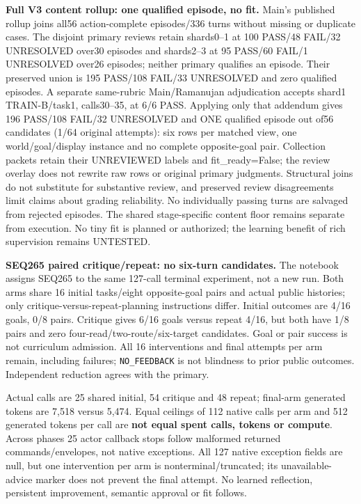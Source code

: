 \documentclass{article}
\begin{document}
\textbf{Full V3 content rollup: one qualified episode, no fit.}
Main's published rollup joins all56 action-complete episodes/336 turns without
missing or duplicate cases. The disjoint primary reviews retain shards0--1 at
100 PASS/48 FAIL/32 UNRESOLVED over30 episodes and shards2--3 at
95 PASS/60 FAIL/1 UNRESOLVED over26 episodes; neither primary qualifies an
episode. Their preserved union is 195 PASS/108 FAIL/33 UNRESOLVED and
zero qualified episodes. A separate same-rubric Main/Ramanujan adjudication
accepts shard1 TRAIN-B/task1, calls30--35, at 6/6 PASS. Applying only that
addendum gives 196 PASS/108 FAIL/32 UNRESOLVED and ONE qualified episode
out of56 candidates (1/64 original attempts): six rows per matched view,
one world/goal/display instance and no complete opposite-goal pair.
Collection packets retain their UNREVIEWED labels and fit\_ready=False;
the review overlay does not rewrite raw rows or original primary judgments.
Structural joins do not substitute for substantive review, and preserved
review disagreements limit claims about grading reliability. No individually
passing turns are salvaged from rejected episodes. The shared stage-specific
content floor remains separate from execution. No tiny fit is planned or
authorized; the learning benefit of rich supervision remains UNTESTED.

\textbf{SEQ265 paired critique/repeat: no six-turn candidates.} The notebook assigns
SEQ265 to the same 127-call terminal experiment, not a new run.
Both arms share 16 initial tasks/eight opposite-goal pairs and actual public
histories; only critique-versus-repeat-planning instructions differ. Initial
outcomes are 4/16 goals, 0/8 pairs. Critique gives 6/16 goals versus repeat 4/16,
but both have 1/8 pairs and zero four-read/two-route/six-target candidates.
Goal or pair success is not curriculum admission. All 16 interventions and
final attempts per arm remain, including failures; \texttt{NO\_FEEDBACK} is not
blindness to prior public outcomes. Independent reduction agrees with the primary.

Actual calls are 25 shared initial, 54 critique and 48 repeat; final-arm
generated tokens are 7,518 versus 5,474. Equal ceilings of 112 native calls
per arm and 512 generated tokens per call are
\textbf{not equal spent calls, tokens or compute}. Across phases 25 actor callback
stops follow malformed returned commands/envelopes, not native exceptions.
All 127 native exception fields are null, but one intervention per arm is
nonterminal/truncated; its unavailable-advice marker does not prevent the
final attempt. No learned reflection, persistent improvement, semantic
approval or fit follows.
\end{document}
